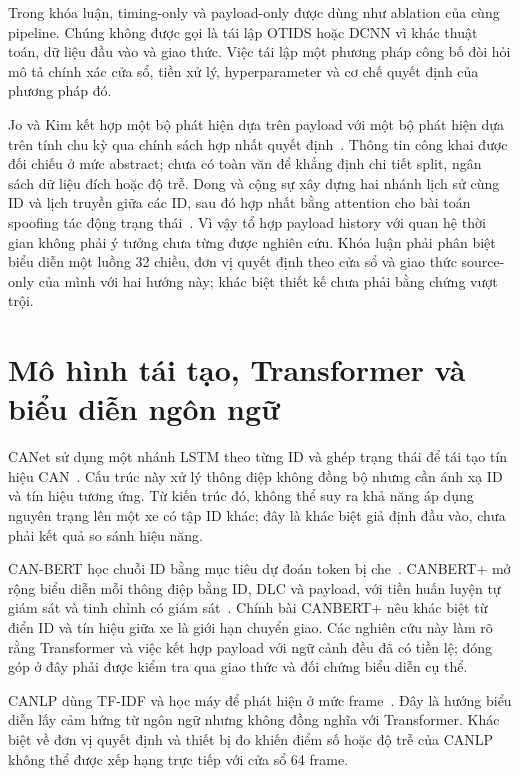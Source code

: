 \documentclass[12pt,a4paper,oneside,openany]{extbook}
\begin{document}
Trong khóa luận, timing-only và payload-only được dùng như ablation của cùng pipeline. Chúng không được gọi là tái lập OTIDS hoặc DCNN vì khác thuật toán, dữ liệu đầu vào và giao thức. Việc tái lập một phương pháp công bố đòi hỏi mô tả chính xác cửa sổ, tiền xử lý, hyperparameter và cơ chế quyết định của phương pháp đó.

Jo và Kim kết hợp một bộ phát hiện dựa trên payload với một bộ phát hiện dựa trên tính chu kỳ qua chính sách hợp nhất quyết định~\cite{jo2026fusion}. Thông tin công khai được đối chiếu ở mức abstract; chưa có toàn văn để khẳng định chi tiết split, ngân sách dữ liệu đích hoặc độ trễ. Dong và cộng sự xây dựng hai nhánh lịch sử cùng ID và lịch truyền giữa các ID, sau đó hợp nhất bằng attention cho bài toán spoofing tác động trạng thái~\cite{dong2026mtff}. Vì vậy tổ hợp payload history với quan hệ thời gian không phải ý tưởng chưa từng được nghiên cứu. Khóa luận phải phân biệt biểu diễn một luồng 32 chiều, đơn vị quyết định theo cửa sổ và giao thức source-only của mình với hai hướng này; khác biệt thiết kế chưa phải bằng chứng vượt trội.

\section{Mô hình tái tạo, Transformer và biểu diễn ngôn ngữ}
CANet sử dụng một nhánh LSTM theo từng ID và ghép trạng thái để tái tạo tín hiệu CAN~\cite{hanselmann2020canet}. Cấu trúc này xử lý thông điệp không đồng bộ nhưng cần ánh xạ ID và tín hiệu tương ứng. Từ kiến trúc đó, không thể suy ra khả năng áp dụng nguyên trạng lên một xe có tập ID khác; đây là khác biệt giả định đầu vào, chưa phải kết quả so sánh hiệu năng.

CAN-BERT học chuỗi ID bằng mục tiêu dự đoán token bị che~\cite{alkhatib2022canbert}. CANBERT+ mở rộng biểu diễn mỗi thông điệp bằng ID, DLC và payload, với tiền huấn luyện tự giám sát và tinh chỉnh có giám sát~\cite{won2026canbertplus}. Chính bài CANBERT+ nêu khác biệt từ điển ID và tín hiệu giữa xe là giới hạn chuyển giao. Các nghiên cứu này làm rõ rằng Transformer và việc kết hợp payload với ngữ cảnh đều đã có tiền lệ; đóng góp ở đây phải được kiểm tra qua giao thức và đối chứng biểu diễn cụ thể.

CANLP dùng TF-IDF và học máy để phát hiện ở mức frame~\cite{balasubramanian2025canlp}. Đây là hướng biểu diễn lấy cảm hứng từ ngôn ngữ nhưng không đồng nghĩa với Transformer. Khác biệt về đơn vị quyết định và thiết bị đo khiến điểm số hoặc độ trễ của CANLP không thể được xếp hạng trực tiếp với cửa sổ 64 frame.
\end{document}
